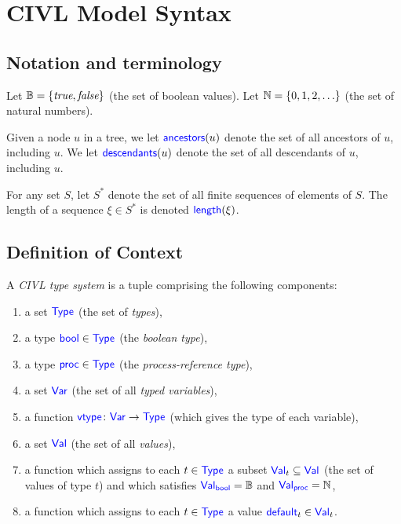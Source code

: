 \documentclass[11pt]{book}
\begin{document}
\section{CIVL Model Syntax}

\subsection{Notation and terminology}
\label{sec:notation}

Let $\B=\{\true,\false\}$ (the set of boolean values).  Let
$\N=\{0,1,2,\ldots\}$ (the set of natural numbers).

Given a node $u$ in a tree, we let $\ancestors(u)$ denote the set of
all ancestors of $u$, including $u$.  We let $\descendants(u)$ denote
the set of all descendants of $u$, including $u$.

For any set $S$, let $S^*$ denote the set of all finite sequences of
elements of $S$.  The length of a sequence $\xi\in S^*$ is denoted
$\len(\xi)$.  


\subsection{Definition of Context}
\label{sec:context}

\begin{definition}
  A \emph{CIVL type system} is a tuple comprising the following
  components:
  \begin{enumerate}
  \item a set $\Type$ (the set of \emph{types}),
  \item a type $\bool\in\Type$ (the \emph{boolean type}),
  \item a type $\proc\in\Type$ (the \emph{process-reference type}),
  \item a set $\Var$ (the set of all \emph{typed variables}),
  \item a function $\vtype\colon \Var\ra\Type$ (which gives the
    type of each variable),
  \item a set $\Val$ (the set of all \emph{values}),
  \item a function which assigns to each $t\in\Type$ a subset
    $\Val_t\subseteq\Val$ (the set of values of type $t$)
    and which satisfies $\Val_{\bool}=\B$ and $\Val_{\proc}=\N$,
  \item a function which assigns to each $t\in\Type$ a value
    $\default_t\in\Val_t$.
  \end{enumerate}
\end{definition}
\end{document}
